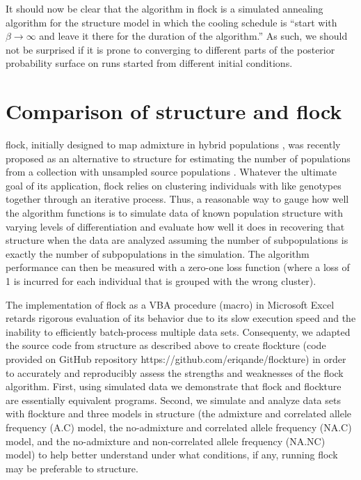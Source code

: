 It should now be clear that the algorithm in {\sc flock} is a simulated annealing 
algorithm for the {\sc structure} model in which the cooling schedule is
``start with $\beta\rightarrow\infty$ and leave it there for the duration of 
the algorithm.''  As such, we should not be surprised if it is prone 
to converging to different parts of the posterior probability surface on runs started
from different initial conditions.


\section*{Comparison of {\sc structure} and {\sc flock}}
{\sc flock}, initially designed to map admixture in hybrid populations 
\citep{Duc&Tur2009}, was recently proposed as an alternative to 
{\sc structure} for estimating the number of populations from a collection with 
unsampled source populations \citep{Duc&Tur2012}. Whatever the ultimate goal
of its application,  
{\sc flock} relies on clustering individuals with like genotypes together  
through an iterative process. Thus, a reasonable way 
to gauge how well the algorithm functions is to simulate data of known 
population structure with varying levels of differentiation and 
evaluate how well it does in recovering that structure when the data are
analyzed assuming
the number of subpopulations is exactly the number of subpopulations in the simulation. The 
algorithm performance can then be measured with a zero-one 
loss function (where a loss of 1 is incurred for each individual that is grouped with the wrong cluster).

The implementation of {\sc flock} as a VBA procedure (macro) in 
Microsoft Excel retards rigorous evaluation of its behavior due 
to its slow execution speed and 
the inability to efficiently batch-process multiple data sets. Consequenty, we adapted 
the source code from {\sc structure} as described above to create {\sc flockture}
(code provided on GitHub repository https://github.com/eriqande/flockture) 
in order to accurately and reproducibly assess the strengths and weaknesses of the {\sc flock} 
algorithm. First, using simulated data we demonstrate that {\sc flock} 
and {\sc flockture} are essentially equivalent programs.
Second, we simulate and analyze data sets with {\sc flockture} 
and three models in {\sc structure} (the admixture and correlated 
allele frequency (A.C) model, the no-admixture and correlated 
allele frequency (NA.C) model, and the no-admixture and non-correlated 
allele frequency (NA.NC) model) to help better understand
under what conditions, if any, running {\sc flock} may be preferable to {\sc structure}. 

